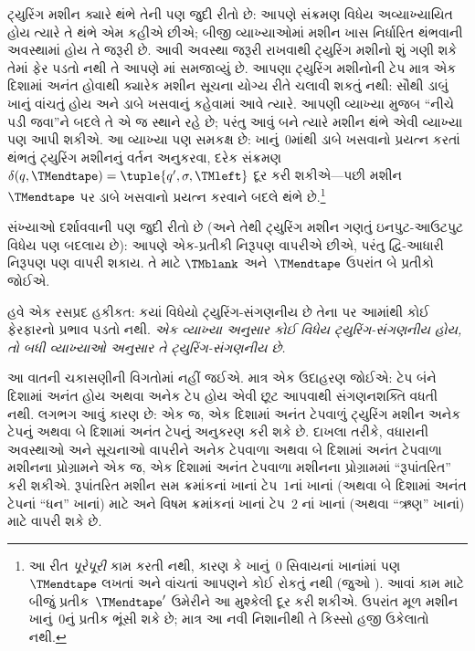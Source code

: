 ટ્યુરિંગ મશીન ક્યારે થંભે તેની પણ જુદી રીતો છે: આપણે
સંક્રમણ વિધેય અવ્યાખ્યાયિત હોય ત્યારે તે થંભે એમ કહીએ
છીએ; બીજી વ્યાખ્યાઓમાં મશીન ખાસ નિર્ધારિત થંભવાની
અવસ્થામાં હોય તે જરૂરી છે. આવી અવસ્થા જરૂરી રાખવાથી
ટ્યુરિંગ મશીનો શું ગણી શકે તેમાં ફેર પડતો નથી તે આપણે
માં સમજાવ્યું છે. આપણા ટ્યુરિંગ મશીનોની
ટેપ માત્ર એક દિશામાં અનંત હોવાથી ક્યારેક મશીન સૂચના
યોગ્ય રીતે ચલાવી શકતું નથી: સૌથી ડાબું ખાનું વાંચતું
હોય અને ડાબે ખસવાનું કહેવામાં આવે ત્યારે. આપણી
વ્યાખ્યા મુજબ ``નીચે પડી જવા''ને બદલે તે એ જ સ્થાને
રહે છે; પરંતુ આવું બને ત્યારે મશીન થંભે એવી વ્યાખ્યા
પણ આપી શકીએ. આ વ્યાખ્યા પણ સમકક્ષ છે: ખાનું~$0$માંથી
ડાબે ખસવાનો પ્રયત્ન કરતાં થંભતું ટ્યુરિંગ મશીનનું વર્તન
અનુકરવા, દરેક સંક્રમણ $\delta(q,\TMendtape) =
\tuple{q',\sigma,\TMleft}$ દૂર કરી શકીએ---પછી
મશીન~$\TMendtape$ પર ડાબે ખસવાનો પ્રયત્ન કરવાને
બદલે થંભે છે.\footnote{આ રીત \emph{પૂરેપૂરી} કામ
કરતી નથી, કારણ કે ખાનું~$0$ સિવાયનાં ખાનાંમાં પણ
$\TMendtape$ લખતાં અને વાંચતાં આપણને કોઈ રોકતું નથી
(જુઓ ). આવાં કામ માટે બીજું
પ્રતીક~$\TMendtape'$ ઉમેરીને આ મુશ્કેલી દૂર કરી શકીએ.
ઉપરાંત મૂળ મશીન ખાનું~$0$નું પ્રતીક ભૂંસી શકે છે; માત્ર
આ નવી નિશાનીથી તે કિસ્સો હજી ઉકેલાતો નથી.}


સંખ્યાઓ દર્શાવવાની પણ જુદી રીતો છે (અને તેથી ટ્યુરિંગ
મશીન ગણતું ઇનપુટ-આઉટપુટ વિધેય પણ બદલાય છે): આપણે
એક-પ્રતીકી નિરૂપણ વાપરીએ છીએ, પરંતુ દ્વિ-આધારી
નિરૂપણ પણ વાપરી શકાય. તે માટે $\TMblank$ અને~$\TMendtape$
ઉપરાંત બે પ્રતીકો જોઈએ.

હવે એક રસપ્રદ હકીકત: કયાં વિધેયો ટ્યુરિંગ-સંગણનીય છે
તેના પર આમાંથી કોઈ ફેરફારનો પ્રભાવ પડતો નથી.
\emph{એક વ્યાખ્યા અનુસાર કોઈ વિધેય ટ્યુરિંગ-સંગણનીય
હોય, તો બધી વ્યાખ્યાઓ અનુસાર તે ટ્યુરિંગ-સંગણનીય છે.}

આ વાતની ચકાસણીની વિગતોમાં નહીં જઈએ. માત્ર એક
ઉદાહરણ જોઈએ: ટેપ બંને દિશામાં અનંત હોય અથવા
અનેક ટેપ હોય એવી છૂટ આપવાથી સંગણનશક્તિ વધતી
નથી. લગભગ આવું કારણ છે: એક જ, એક દિશામાં
અનંત ટેપવાળું ટ્યુરિંગ મશીન અનેક ટેપનું અથવા બે
દિશામાં અનંત ટેપનું અનુકરણ કરી શકે છે. દાખલા તરીકે,
વધારાની અવસ્થાઓ અને સૂચનાઓ વાપરીને અનેક ટેપવાળા
અથવા બે દિશામાં અનંત ટેપવાળા મશીનના પ્રોગ્રામને
એક જ, એક દિશામાં અનંત ટેપવાળા મશીનના પ્રોગ્રામમાં
``રૂપાંતરિત'' કરી શકીએ. રૂપાંતરિત મશીન સમ ક્રમાંકનાં
ખાનાં ટેપ~$1$નાં ખાનાં (અથવા બે દિશામાં અનંત ટેપનાં
``ધન'' ખાનાં) માટે અને વિષમ ક્રમાંકનાં ખાનાં ટેપ~$2$
નાં ખાનાં (અથવા ``ઋણ'' ખાનાં) માટે વાપરી શકે છે.
\endgroup


